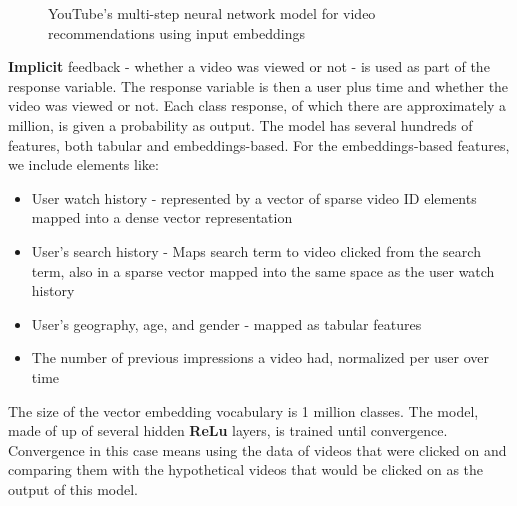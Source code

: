\documentclass[11pt, table]{diazessay} %
\begin{document}
\begin{sloppypar}
\begin{figure}[H]
\caption{YouTube's multi-step neural network model for video recommendations using input embeddings\citep{covington2016deep}}
\end{figure}

\textbf{Implicit} feedback - whether a video was viewed or not - is used as part of the response variable. The response variable is then a user plus time and whether the video was viewed or not. Each class response, of which there are approximately a million, is given a probability as output.  The model has several hundreds of features, both tabular and embeddings-based. For the embeddings-based features, we include elements like: 

\begin{itemize}
  \item User watch history - represented by a vector of sparse video ID elements mapped into a dense vector representation
  \item User's search history - Maps search term to video clicked from the search term, also in a sparse vector mapped into the same space as the user watch history 
  \item User's geography, age, and gender - mapped as tabular features
  \item The number of previous impressions a video had, normalized per user over time
\end{itemize}

The size of the vector embedding vocabulary is 1 million classes. The model, made of up of several hidden \textbf{ReLu} layers, is trained until convergence. Convergence in this case means using the data of videos that were clicked on and comparing them with the hypothetical videos that would be clicked on as the output of this model. 


\end{sloppypar}
\end{document}

